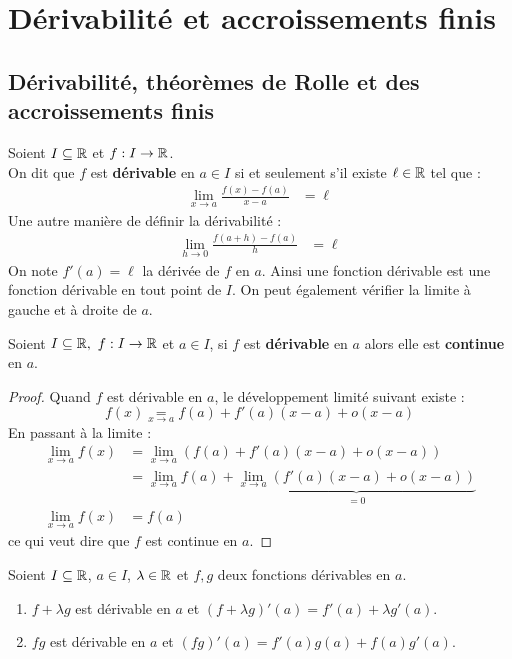 \chapter{Dérivabilité et accroissements finis}
\def\arraystretch{1}

\section{Dérivabilité, théorèmes de Rolle et des accroissements finis}
\begin{definition}
	Soient $I \subseteq \mathbb{R}$ et $f : I \to \mathbb{R}$.
	\\
	On dit que $f$ est \textbf{dérivable} en $a \in I$ si et seulement s'il existe $\ell \in \mathbb{R}$ tel que :
	\begin{align*}
		  \lim_{x \to a} \frac{f(x) - f(a)}{x - a} &= \ell
	\end{align*}
    Une autre manière de définir la dérivabilité :
    \begin{align*}
        \lim_{h \to 0} \frac{f(a + h) - f(a)}{h} &= \ell
    \end{align*}
	On note $f'(a) = \ell$ la dérivée de $f$ en $a$.
	Ainsi une fonction dérivable est une fonction dérivable en tout point de $I$.
	On peut également vérifier la limite à gauche et à droite de $a$.
\end{definition}

\begin{proposition}
	Soient $I \subseteq \mathbb{R},\ f : I \to \mathbb{R}$ et $a \in I$, si $f$ est \textbf{dérivable} en $a$ alors elle est \textbf{continue} en $a$.
\end{proposition}

\begin{proof}
	Quand $f$ est dérivable en $a$, le développement limité suivant existe :
	\[ f(x) \underset{x \to a}{=} f(a) + f'(a)(x - a) + o(x - a) \]
	En passant à la limite :
	\begin{align*}
		\lim_{x \to a} f(x) &= \lim_{x \to a} \left( f(a) + f'(a)(x - a) + o(x - a) \right) \\
		&= \lim_{x \to a} f(a) + \underbrace{\lim_{x \to a} \left( f'(a)(x - a) + o(x - a) \right)}_{= 0} \\
		\lim_{x \to a} f(x) &= f(a)
	\end{align*}
	ce qui veut dire que $f$ est continue en $a$.
\end{proof}

\begin{theorem}
	Soient $I \subseteq \mathbb{R}$, $a \in I$, $\lambda \in \mathbb{R}$ et $f, g$ deux fonctions dérivables en $a$.
	\begin{enumerate}
		\item $f + \lambda g$ est dérivable en $a$ et $(f + \lambda g)'(a) = f'(a) + \lambda g'(a)$.
		\item $f g$ est dérivable en $a$ et $(fg)'(a) = f'(a) g(a) + f(a) g'(a)$.
	\end{enumerate}
\end{theorem}


